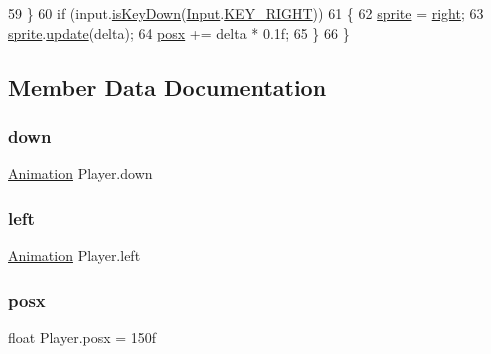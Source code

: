 \begin{DoxyCode}
59 \}
60 \textcolor{keywordflow}{if} (input.\mbox{\hyperlink{classorg_1_1newdawn_1_1slick_1_1_input_a2b904c85a112a9c531457c465f366ca8}{isKeyDown}}(\mbox{\hyperlink{classorg_1_1newdawn_1_1slick_1_1_input}{Input}}.\mbox{\hyperlink{classorg_1_1newdawn_1_1slick_1_1_input_a6b75d25526d739570423da1788958fc5}{KEY\_RIGHT}}))
61 \{
62     \mbox{\hyperlink{class_player_a500d31b34518044f505159570d00a774}{sprite}} = \mbox{\hyperlink{class_player_a64f2b14c132dcace9efb06b2cfb499b2}{right}};
63     \mbox{\hyperlink{class_player_a500d31b34518044f505159570d00a774}{sprite}}.\mbox{\hyperlink{classorg_1_1newdawn_1_1slick_1_1_animation_a24420dcd4e89ff617ed52a265e014ba5}{update}}(delta);
64     \mbox{\hyperlink{class_player_a8c2978dfd4bab9a91bf1793b0edbe698}{posx}} += delta * 0.1f;
65 \}
66     \}
\end{DoxyCode}


\subsection{Member Data Documentation}
\mbox{\label{class_player_afd6877026455f117ab11a7dff0ebc66b}} 
\subsubsection{\texorpdfstring{down}{down}}
{\footnotesize\ttfamily \mbox{\hyperlink{classorg_1_1newdawn_1_1slick_1_1_animation}{Animation}} Player.\+down\hspace{0.3cm}{\ttfamily [package]}}

\mbox{\label{class_player_a8498ed1f7da9f5eece81ff568b7cfb1e}} 
\subsubsection{\texorpdfstring{left}{left}}
{\footnotesize\ttfamily \mbox{\hyperlink{classorg_1_1newdawn_1_1slick_1_1_animation}{Animation}} Player.\+left\hspace{0.3cm}{\ttfamily [package]}}

\mbox{\label{class_player_a8c2978dfd4bab9a91bf1793b0edbe698}} 
\subsubsection{\texorpdfstring{posx}{posx}}
{\footnotesize\ttfamily float Player.\+posx = 150f\hspace{0.3cm}{\ttfamily [private]}}


